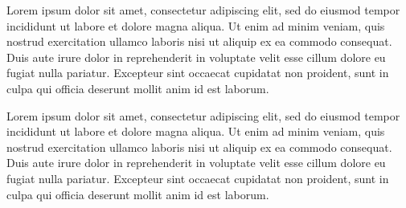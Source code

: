 \documentclass{article}
\begin{document}
Lorem ipsum dolor sit amet, consectetur adipiscing elit, sed do eiusmod tempor incididunt ut labore et dolore magna aliqua. Ut enim ad minim veniam, quis nostrud exercitation ullamco laboris nisi ut aliquip ex ea commodo consequat. Duis aute irure dolor in reprehenderit in voluptate velit esse cillum dolore eu fugiat nulla pariatur. Excepteur sint occaecat cupidatat non proident, sunt in culpa qui officia deserunt mollit anim id est laborum. 

\begin{table}[!hbt]
\vskip 0.25cm
\caption{Sample table caption.}
\end{table}

Lorem ipsum dolor sit amet, consectetur adipiscing elit, sed do eiusmod tempor incididunt ut labore et dolore magna aliqua. Ut enim ad minim veniam, quis nostrud exercitation ullamco laboris nisi ut aliquip ex ea commodo consequat. Duis aute irure dolor in reprehenderit in voluptate velit esse cillum dolore eu fugiat nulla pariatur. Excepteur sint occaecat cupidatat non proident, sunt in culpa qui officia deserunt mollit anim id est laborum. 

\footnotesize
\end{document}
